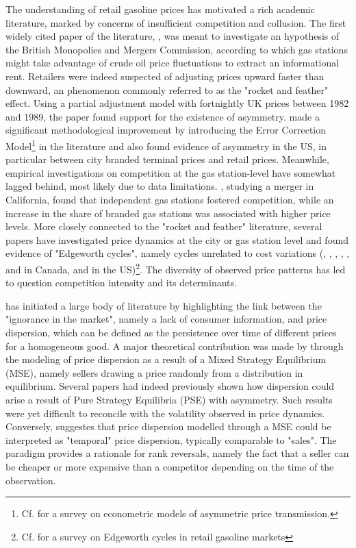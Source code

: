 \documentclass[english]{article}
\begin{document}
The understanding of retail gasoline prices has motivated a rich academic literature, marked by concerns of insufficient competition and collusion. The first widely cited paper of the literature, \cite{BAC91}, was meant to investigate an hypothesis of the British Monopolies and Mergers Commission, according to which gas stations might take advantage of crude oil price fluctuations to extract an informational rent. Retailers were indeed suspected of adjusting prices upward faster than downward, an phenomenon commonly referred to as the "rocket and feather" effect. Using a partial adjustment model with fortnightly UK prices between 1982 and 1989, the paper found support for the existence of asymmetry. \cite{BOR97} made a significant methodological improvement by introducing the Error Correction Model\footnote{Cf. \cite{FRE07} for a survey on econometric models of asymmetric price transmission.} in the literature and also found evidence of asymmetry in the US, in particular between city branded terminal prices and retail prices. Meanwhile, empirical investigations on competition at the gas station-level have somewhat lagged behind, most likely due to data limitations. \cite{HAS04}, studying a merger in California, found that independent gas stations fostered competition, while an increase in the share of branded gas stations was associated with higher price levels. More closely connected to the "rocket and feather" literature, several papers have investigated price dynamics at the city or gas station level and found evidence of "Edgeworth cycles", namely cycles unrelated to cost variations (\cite{ECK02}, \cite{ECK03}, \cite{ECK04a}, \cite{ECK04b}, \cite{NOE07a}, \cite{NOE07b} and \cite{NOE08} in Canada, \cite{LEW09} and \cite{LEW11a} in the US)\footnote{Cf. \cite{ECK13} for a survey on Edgeworth cycles in retail gasoline markets}. The diversity of observed price patterns has led to question competition intensity and its determinants.

\cite{STI61} has initiated a large body of literature by highlighting the link between the "ignorance in the market", namely a lack of consumer information, and price dispersion, which can be defined as the persistence over time of different prices for a homogeneous good. A major theoretical contribution was made by \cite{VAR80} through the modeling of price dispersion as a result of a Mixed Strategy Equilibrium (MSE), namely sellers drawing a price randomly from a distribution in equilibrium. Several papers had indeed previously shown how dispersion could arise a result of Pure Strategy Equilibria (PSE) with asymmetry. Such results were yet difficult to reconcile with the volatility observed in price dynamics. Conversely, \cite{VAR80} suggestes that price dispersion modelled through a MSE could be interpreted as "temporal" price dispersion, typically comparable to "sales". The \cite{VAR80} paradigm provides a rationale for rank reversals, namely the fact that a seller can be cheaper or more expensive than a competitor depending on the time of the observation.
\end{document}
